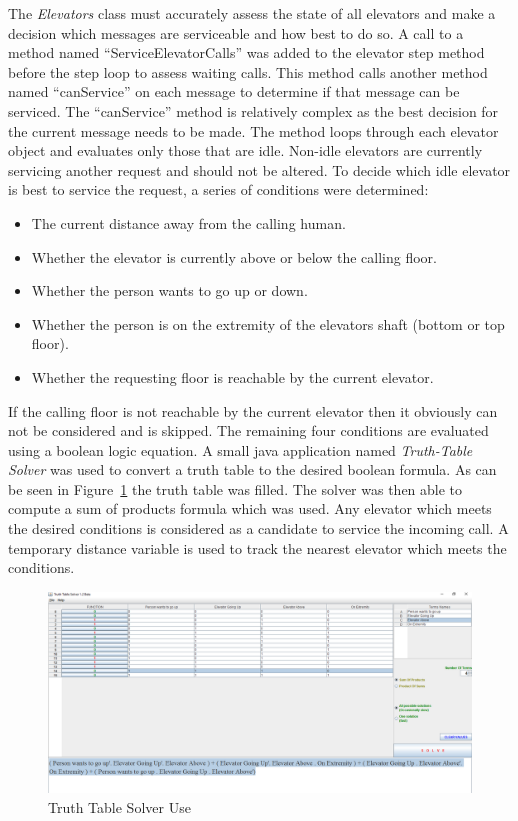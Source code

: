 \documentclass{article}
\begin{document}
The \textit{Elevators} class must accurately assess the state of all elevators and make a decision which messages are serviceable and how best to do so.
A call to a method named ``ServiceElevatorCalls'' was added to the elevator step method before the step loop to assess waiting calls.
This method calls another method named ``canService'' on each message to determine if that message can be serviced.
The ``canService'' method is relatively complex as the best decision for the current message needs to be made.
The method loops through each elevator object and evaluates only those that are idle.
Non-idle elevators are currently servicing another request and should not be altered.
To decide which idle elevator is best to service the request, a series of conditions were determined:
\begin{itemize}
	\item The current distance away from the calling human.
	\item Whether the elevator is currently above or below the calling floor.
	\item Whether the person wants to go up or down.
	\item Whether the person is on the extremity of the elevators shaft (bottom or top floor).
	\item Whether the requesting floor is reachable by the current elevator.
\end{itemize} 
If the calling floor is not reachable by the current elevator then it obviously can not be considered and is skipped.
The remaining four conditions are evaluated using a boolean logic equation.
A small java application named \textit{Truth-Table Solver} was used to convert a truth table to the desired boolean formula.
As can be seen in Figure~\ref{fig:untitled} the truth table was filled.
The solver was then able to compute a sum of products formula which was used.
Any elevator which meets the desired conditions is considered as a candidate to service the incoming call.
A temporary distance variable is used to track the nearest elevator which meets the conditions.\newline
\begin{figure}
	\centering
	\includegraphics[width=1\linewidth]{Untitled}
	\caption[Truth Table Solver Use]{Truth Table Solver Use}
	\label{fig:untitled}
\end{figure}
\end{document}
